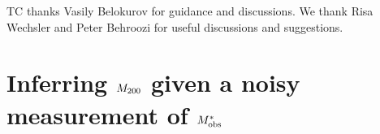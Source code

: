 \documentclass[useAMS,usenatbib]{mn2e}
\begin{document}
TC thanks Vasily Belokurov for guidance and discussions.
We thank Risa Wechsler and Peter Behroozi for useful discussions and 
suggestions.



\appendix


\section{Inferring $M_{200}$ given a noisy measurement of $M^{*}_{\rm obs}$}
\label{appendix:MSMH}





% 

% 
% 




\label{lastpage}
\bsp
\end{document}

